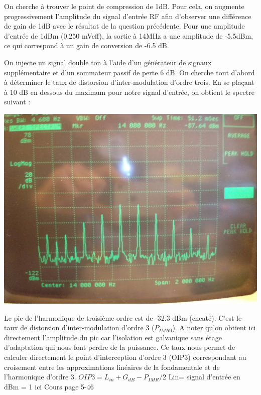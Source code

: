 \documentclass{article}
\begin{document}

On cherche à trouver le point de compression de 1dB. Pour cela, on augmente progressivement l'amplitude du signal d'entrée RF afin d'observer une différence de gain de 1dB avec le résultat de la question précédente.
Pour une amplitude d'entrée de 1dBm (0.250 mVeff), la sortie à 14MHz a une amplitude de -5.5dBm, ce qui correspond à un gain de  conversion de -6.5 dB.


On injecte un signal double ton à l'aide d'un générateur de signaux supplémentaire et d'un sommateur passif de perte 6 dB.
On cherche tout d'abord à déterminer le taux de distorsion d'inter-modulation d'ordre trois.
En se plaçant à 10 dB en dessous du maximum pour notre signal d'entrée, on obtient le spectre suivant :
\begin{center}
\includegraphics[width=0.7\linewidth]{9_3_4.jpg}
\end{center}

Le pic de l'harmonique de troisième ordre est de -32.3 dBm (cheaté). C'est le taux de distorsion d'inter-modulation d'ordre 3 ($P_{IMR0}$). A noter qu'on obtient ici directement l'amplitude du pic car l'isolation est galvanique sans étage d'adaptation qui nous font perdre de la puissance.
Ce taux nous permet de calculer directement le point d'interception d'ordre 3 (OIP3) correspondant au croisement entre les approximations linéaires de la fondamentale et de l'harmonique d'ordre 3.
$OIP3=L_{in}+G_{dB}-P_{IMR}/2$
Lin= signal d'entrée en dBm = 1 ici
Cours page 5-46
 
\end{document}
